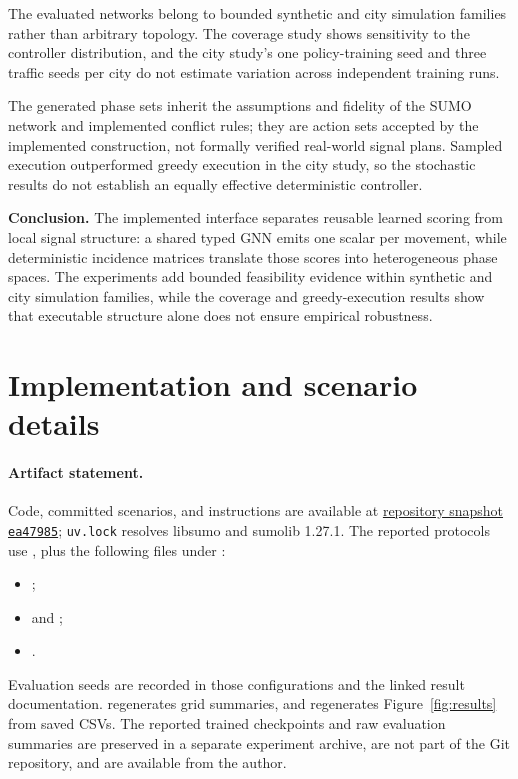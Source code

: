 \documentclass[10pt,a4paper]{article}
\begin{document}
The evaluated networks belong to bounded synthetic and city simulation families rather than arbitrary topology.
The coverage study shows sensitivity to the controller distribution, and the city study's one policy-training seed and three traffic seeds per city do not estimate variation across independent training runs.

The generated phase sets inherit the assumptions and fidelity of the SUMO network and implemented conflict rules; they are action sets accepted by the implemented construction, not formally verified real-world signal plans.
Sampled execution outperformed greedy execution in the city study, so the stochastic results do not establish an equally effective deterministic controller.

\textbf{Conclusion.}
The implemented interface separates reusable learned scoring from local signal structure: a shared typed GNN emits one scalar per movement, while deterministic incidence matrices translate those scores into heterogeneous phase spaces.
The experiments add bounded feasibility evidence within synthetic and city simulation families, while the coverage and greedy-execution results show that executable structure alone does not ensure empirical robustness.

\label{lastmainpage}
\clearpage



\clearpage
\appendix
\section{Implementation and scenario details}

\paragraph{Artifact statement.}
Code, committed scenarios, and instructions are available at
\href{https://github.com/BertilBraun/GNN-Traffic-Signal-Control/tree/ea47985}{repository snapshot \texttt{ea47985}}; \texttt{uv.lock} resolves libsumo and sumolib 1.27.1.
The reported protocols use ,
plus the following files under :
\begin{itemize}
  \item {};
  \item {} and ;
  \item {}.
\end{itemize}
Evaluation seeds are recorded in those configurations and the linked result documentation.
 regenerates grid summaries, and  regenerates Figure~\ref{fig:results} from saved CSVs.
The reported trained checkpoints and raw evaluation summaries are preserved in a separate experiment archive, are not part of the Git repository, and are available from the author.
\end{document}
